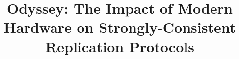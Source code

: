 \documentclass[sigplan, screen]{acmart}
\begin{document}
\title[Odyssey: The Impact of Modern Hardware on Replication Protocols ]{ Odyssey: The Impact of Modern Hardware on Strongly-Consistent Replication Protocols}

\date{}


\maketitle
\thispagestyle{empty}




















\end{document}
